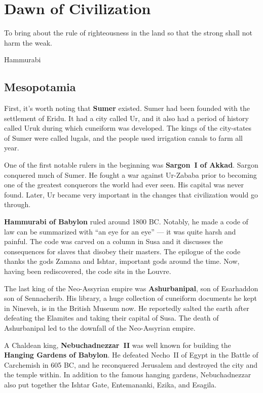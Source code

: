 \chapter{Dawn of Civilization}

\epigraph{%
  To bring about the rule of righteousness in the land so that the strong shall not harm the weak.
}{Hammurabi}

\section{Mesopotamia}

First, it's worth noting that \textbf{Sumer} existed.
Sumer had been founded with the settlement of Eridu.
It had a city called Ur,
and it also had a period of history called Uruk during which cuneiform was developed.
The kings of the city-states of Sumer were called lugals,
and the people used irrigation canals to farm all year.

One of the first notable rulers in the beginning was \textbf{Sargon~I of Akkad}.
Sargon conquered much of Sumer.
He fought a war against Ur-Zababa prior to becoming one of the greatest conquerors the world had ever seen.
His capital was never found.
Later, Ur became very important in the changes that civilization would go through.

\textbf{Hammurabi of Babylon} ruled around 1800 BC\@.
Notably, he made a code of law can be summarized with ``an eye for an eye'' --- it was quite harsh and painful.
The code was carved on a column in Susa and it discusses the consequences for slaves that disobey their masters.
The epilogue of the code thanks the gods Zamana and Ishtar, important gods around the time.
Now, having been rediscovered, the code sits in the Louvre.

The last king of the Neo-Assyrian empire was \textbf{Ashurbanipal}, son of Esarhaddon son of Sennacherib.
His library, a huge collection of cuneiform documents he kept in Nineveh, is in the British Museum now.
He reportedly salted the earth after defeating the Elamites and taking their capital of Susa.
The death of Ashurbanipal led to the downfall of the Neo-Assyrian empire.

A Chaldean king, \textbf{Nebuchadnezzar~II} was well known for building the \textbf{Hanging Gardens of Babylon}.
He defeated Necho~II of Egypt in the Battle of Carchemish in 605 BC,
and he reconquered Jerusalem and destroyed the city and the temple within.
In addition to the famous hanging gardens, Nebuchadnezzar also put together the Ishtar Gate,
Entemananki, Ezika, and Esagila.

